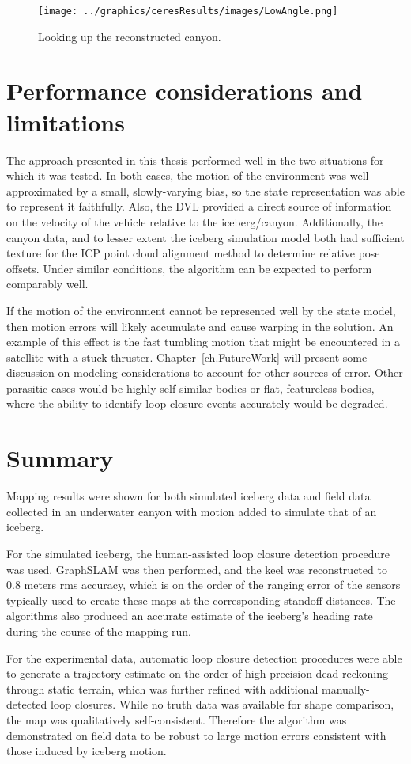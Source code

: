  \begin{figure}[!htb]
   \centering
   \texttt{[image: ../graphics/ceresResults/images/LowAngle.png]} %
   \caption{Looking up the reconstructed canyon.}
   \label{fig:RealDataSolution5}
\end{figure}

\section{Performance considerations and limitations}

The approach presented in this thesis performed well in the two situations for which it was tested. In both cases, the motion of the environment was well-approximated by a small, slowly-varying bias, so the state representation was able to represent it faithfully. Also, the DVL provided a direct source of information on the velocity of the vehicle relative to the iceberg/canyon. Additionally, the canyon data, and to lesser extent the iceberg simulation model both had sufficient texture for the ICP point cloud alignment method to determine relative pose offsets. Under similar conditions, the algorithm can be expected to perform comparably well.

If the motion of the environment cannot be represented well by the state model, then motion errors will likely accumulate and cause warping in the solution. An example of this effect is the fast tumbling motion that might be encountered in a satellite with a stuck thruster. Chapter~\ref{ch.FutureWork} will present some discussion on modeling considerations to account for other sources of error. Other parasitic cases would be highly self-similar bodies or flat, featureless bodies, where the ability to identify loop closure events accurately would be degraded. 

\section{Summary}

Mapping results were shown for both simulated iceberg data and field data collected in an underwater canyon with motion added to simulate that of an iceberg. 

For the simulated iceberg, the human-assisted loop closure detection procedure was used. GraphSLAM was then performed, and the keel was reconstructed to 0.8 meters rms accuracy, which is on the order of the ranging error of the sensors typically used to create these maps at the corresponding standoff distances. The algorithms also produced an accurate estimate of the iceberg's heading rate during the course of the mapping run.

For the experimental data, automatic loop closure detection procedures were able to generate a trajectory estimate on the order of high-precision dead reckoning through static terrain, which was further refined with additional manually-detected loop closures.  While no truth data was available for shape comparison, the map was qualitatively self-consistent. Therefore the algorithm was demonstrated on field data to be robust to large motion errors consistent with those induced by iceberg motion.


